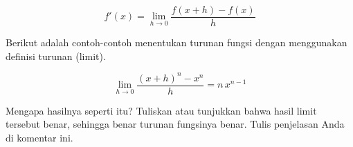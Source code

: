 \documentclass{article}
\begin{document}
\begin{eulernotebook}
\begin{eulercomment}
\begin{eulercomment}
\begin{eulercomment}
\end{eulercomment}
\begin{eulerformula}
\[
f'(x) = \lim_{h\to 0} \frac{f(x+h)-f(x)}{h}
\]
\end{eulerformula}
\begin{eulercomment}
Berikut adalah contoh-contoh menentukan turunan fungsi dengan
menggunakan definisi turunan (limit).
\end{eulercomment}
\begin{eulerformula}
\[
\lim_{h\rightarrow 0}{\frac{\left(x+h\right)^{n}-x^{n}}{h}}=n\,x^{n  -1}
\]
\end{eulerformula}
\begin{eulercomment}
Mengapa hasilnya seperti itu? Tuliskan atau tunjukkan bahwa hasil
limit tersebut benar, sehingga benar turunan fungsinya benar.  Tulis
penjelasan Anda di komentar ini.


\end{eulercomment}
\end{eulercomment}
\end{eulercomment}
\end{eulernotebook}
\end{document}

